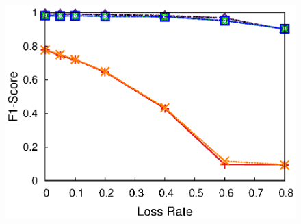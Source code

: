 {\begin{figure}[h!]
{    \includegraphics[width=\figurewidthI]{fig/dect.PureRandLoss.srmf_based_pred.Mob-Recv1run1.dat0_matrix.mat_dB.txt.1000.90.1.1000.r32.period1.org.2d.elem.ind.elem1.burst1.na0.05.anom3.noise0.thresh-1.eps}
  }
  \hspace{-0.1in}
  \hspace{-0.1in}
  \subfigure[CU RSSI]{
}
\end{figure}}
